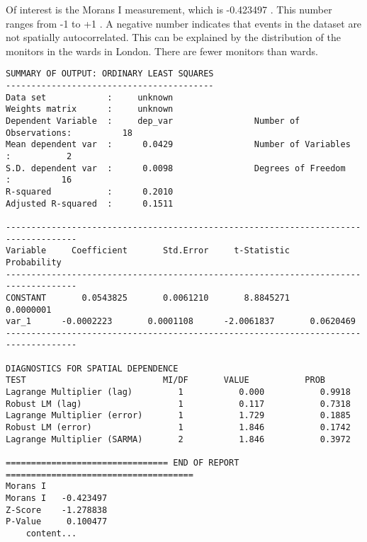 Of interest is the Morans I measurement, which is -0.423497 . This number ranges from -1 to +1 . A negative number indicates that events in the dataset are not spatially autocorrelated. This can be explained by the distribution of the monitors in the wards in London. There are fewer monitors than wards.


\begin{verbatim}
SUMMARY OF OUTPUT: ORDINARY LEAST SQUARES
-----------------------------------------
Data set            :     unknown
Weights matrix      :     unknown
Dependent Variable  :     dep_var                Number of Observations:          18
Mean dependent var  :      0.0429                Number of Variables   :           2
S.D. dependent var  :      0.0098                Degrees of Freedom    :          16
R-squared           :      0.2010
Adjusted R-squared  :      0.1511

------------------------------------------------------------------------------------
Variable     Coefficient       Std.Error     t-Statistic     Probability
------------------------------------------------------------------------------------
CONSTANT       0.0543825       0.0061210       8.8845271       0.0000001
var_1      -0.0002223       0.0001108      -2.0061837       0.0620469
------------------------------------------------------------------------------------

DIAGNOSTICS FOR SPATIAL DEPENDENCE
TEST                           MI/DF       VALUE           PROB
Lagrange Multiplier (lag)         1           0.000           0.9918
Robust LM (lag)                   1           0.117           0.7318
Lagrange Multiplier (error)       1           1.729           0.1885
Robust LM (error)                 1           1.846           0.1742
Lagrange Multiplier (SARMA)       2           1.846           0.3972

================================ END OF REPORT =====================================
Morans I
Morans I   -0.423497
Z-Score    -1.278838
P-Value     0.100477
	content...
\end{verbatim}


